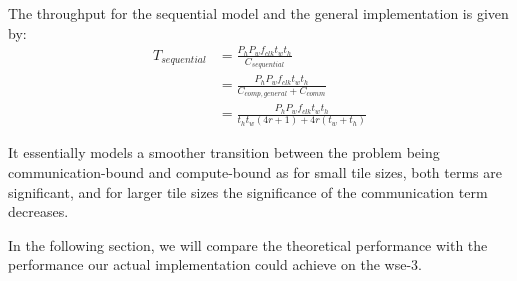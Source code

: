The throughput for the sequential model and the general implementation is given by:
\begin{equation}
    \label{eq:throughput_sequential}
    \begin{aligned}
        T_{sequential} &= \frac{P_h P_w f_{clk} t_w t_h}{C_{sequential}} \\[1ex]
        &= \frac{P_h P_w f_{clk} t_w t_h}{C_{comp,general} + C_{comm}} \\[1ex]
        &= \frac{P_h P_w f_{clk} t_w t_h}{t_h t_w \left(4r + 1\right) + 4r\left(t_w+t_h\right)}
    \end{aligned}
\end{equation}

It essentially models a smoother transition between the problem being communication-bound and compute-bound as for small tile sizes, both terms are significant, and for larger tile sizes the significance of the communication term decreases.

In the following section, we will compare the theoretical performance with the performance our actual implementation could achieve on the \ac{wse}-3.